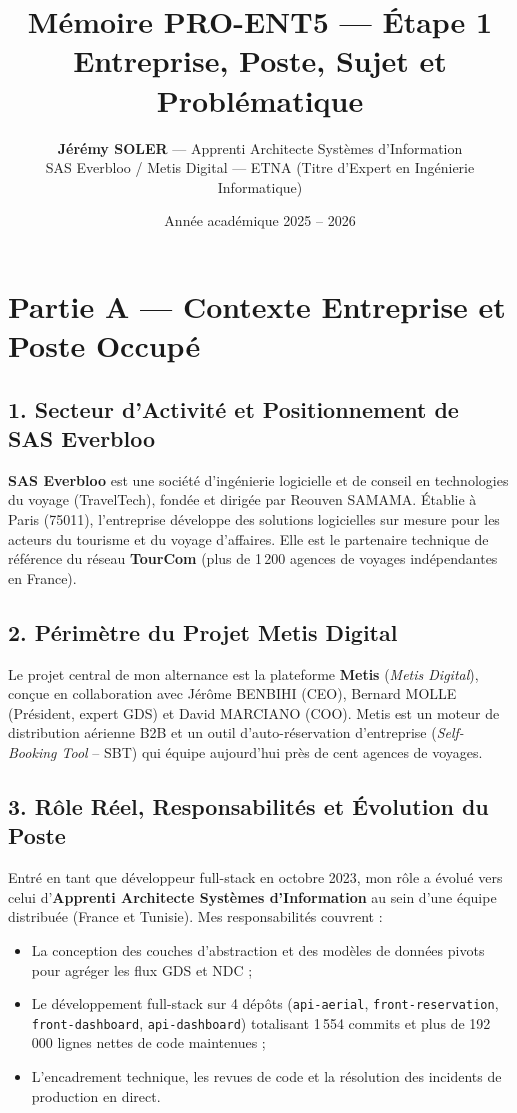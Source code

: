 \documentclass[11pt,a4paper]{article}
\title{\vspace{-1cm}\Huge\textbf{\textcolor{NavyBlue}{Mémoire PRO-ENT5 — Étape 1}}\\[6pt]
\Large\textbf{\textcolor{CobaltBlue}{Entreprise, Poste, Sujet et Problématique}}}
\author{\textbf{Jérémy SOLER} — Apprenti Architecte Systèmes d'Information\\
SAS Everbloo / Metis Digital — ETNA (Titre d'Expert en Ingénierie Informatique)}
\date{Année académique 2025 -- 2026}
\begin{document}
\maketitle

\vspace{0.2cm}

\section*{Partie A — Contexte Entreprise et Poste Occupé}

\subsection*{1. Secteur d'Activité et Positionnement de SAS Everbloo}
\textbf{SAS Everbloo} est une société d'ingénierie logicielle et de conseil en technologies du voyage (TravelTech), fondée et dirigée par Reouven SAMAMA. Établie à Paris (75011), l'entreprise développe des solutions logicielles sur mesure pour les acteurs du tourisme et du voyage d'affaires. Elle est le partenaire technique de référence du réseau \textbf{TourCom} (plus de 1\,200 agences de voyages indépendantes en France).

\subsection*{2. Périmètre du Projet Metis Digital}
Le projet central de mon alternance est la plateforme \textbf{Metis} (\textit{Metis Digital}), conçue en collaboration avec Jérôme BENBIHI (CEO), Bernard MOLLE (Président, expert GDS) et David MARCIANO (COO). Metis est un moteur de distribution aérienne B2B et un outil d'auto-réservation d'entreprise (\textit{Self-Booking Tool} -- SBT) qui équipe aujourd'hui près de cent agences de voyages.

\subsection*{3. Rôle Réel, Responsabilités et Évolution du Poste}
Entré en tant que développeur full-stack en octobre 2023, mon rôle a évolué vers celui d'\textbf{Apprenti Architecte Systèmes d'Information} au sein d'une équipe distribuée (France et Tunisie). Mes responsabilités couvrent :
\begin{itemize}[itemsep=2pt]
    \item La conception des couches d'abstraction et des modèles de données pivots pour agréger les flux GDS et NDC ;
    \item Le développement full-stack sur 4 dépôts (\texttt{api-aerial}, \texttt{front-reservation}, \texttt{front-dashboard}, \texttt{api-dashboard}) totalisant 1\,554 commits et plus de 192\,000 lignes nettes de code maintenues ;
    \item L'encadrement technique, les revues de code et la résolution des incidents de production en direct.
\end{itemize}
\end{document}
